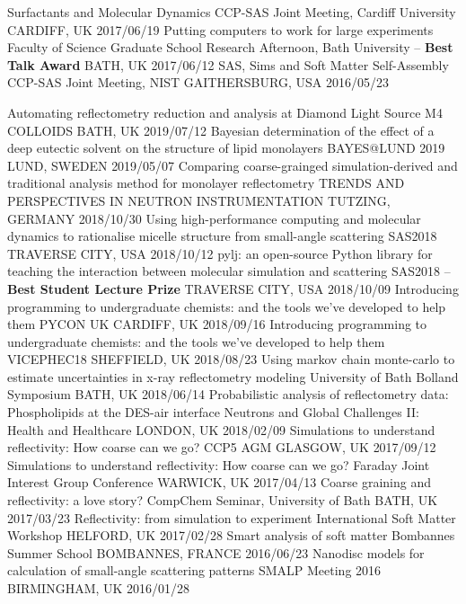 \begin{cvhonors}
  \cvhonor
    {Surfactants and Molecular Dynamics}
    {CCP-SAS Joint Meeting, Cardiff University}
    {CARDIFF, UK}
    {2017/06/19}
  \cvhonor
  	{Putting computers to work for large experiments}
    {Faculty of Science Graduate School Research Afternoon, Bath University -- \textbf{Best Talk Award}}
    {BATH, UK}
    {2017/06/12}
  \cvhonor
    {SAS, Sims and Soft Matter Self-Assembly}
    {CCP-SAS Joint Meeting, NIST}
    {GAITHERSBURG, USA}
    {2016/05/23}
\end{cvhonors}
\begin{cvhonors}
  \cvhonor
    {Automating reflectometry reduction and analysis at Diamond Light Source}
    {M4 COLLOIDS}
    {BATH, UK}
    {2019/07/12}
  \cvhonor
    {Bayesian determination of the effect of a deep eutectic solvent on the structure of lipid monolayers}
    {BAYES@LUND 2019}
    {LUND, SWEDEN}
    {2019/05/07}
  \cvhonor
    {Comparing coarse-grainged simulation-derived and traditional analysis method for monolayer reflectometry}
    {TRENDS AND PERSPECTIVES IN NEUTRON INSTRUMENTATION}
    {TUTZING, GERMANY}
    {2018/10/30}
  \cvhonor
    {Using high-performance computing and molecular dynamics to rationalise micelle structure from small-angle scattering}
    {SAS2018}
    {TRAVERSE CITY, USA}
    {2018/10/12}
  \cvhonor
    {pylj: an open-source Python library for teaching the interaction between molecular simulation and scattering}
	{SAS2018 -- \textbf{Best Student Lecture Prize}}
    {TRAVERSE CITY, USA}
    {2018/10/09}
  \cvhonor
    {Introducing programming to undergraduate chemists: and the tools we've developed to help them}
    {PYCON UK}
    {CARDIFF, UK}
    {2018/09/16}
  \cvhonor
    {Introducing programming to undergraduate chemists: and the tools we've developed to help them}
    {VICEPHEC18}
    {SHEFFIELD, UK}
    {2018/08/23}
  \cvhonor
    {Using markov chain monte-carlo to estimate uncertainties in x-ray reflectometry modeling}
    {University of Bath Bolland Symposium}
    {BATH, UK}
    {2018/06/14}
  \cvhonor
    {Probabilistic analysis of reflectometry data: Phospholipids at the DES-air interface}
    {Neutrons and Global Challenges II: Health and Healthcare}
    {LONDON, UK}
    {2018/02/09}
  \cvhonor
    {Simulations to understand reflectivity: How coarse can we go?}
    {CCP5 AGM}
    {GLASGOW, UK}
    {2017/09/12}
  \cvhonor
  	{Simulations to understand reflectivity: How coarse can we go?}
    {Faraday Joint Interest Group Conference}
    {WARWICK, UK}
    {2017/04/13}
  \cvhonor
  	{Coarse graining and reflectivity: a love story?}
    {CompChem Seminar, University of Bath}
    {BATH, UK}
    {2017/03/23}
  \cvhonor
  	{Reflectivity: from simulation to experiment}
    {International Soft Matter Workshop}
    {HELFORD, UK}
    {2017/02/28}
  \cvhonor
    {Smart analysis of soft matter}
    {Bombannes Summer School}
    {BOMBANNES, FRANCE}
    {2016/06/23}
  \cvhonor
    {Nanodisc models for calculation of small-angle scattering patterns}
    {SMALP Meeting 2016}
    {BIRMINGHAM, UK}
    {2016/01/28}
\end{cvhonors}
